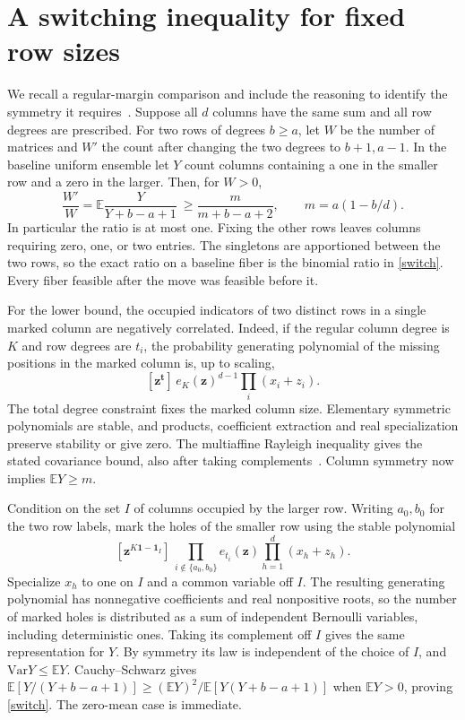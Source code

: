 \documentclass[11pt]{article}
\newcommand{\E}{\mathbb E}
\newcommand{\Var}{\mathrm{Var}}
\begin{document}
\section{A switching inequality for fixed row sizes}
We recall a regular-margin comparison and include the reasoning to identify the symmetry it requires~\cite{regular}. Suppose all $d$ columns have the same sum and all row degrees are prescribed. For two rows of degrees $b\ge a$, let $W$ be the number of matrices and $W'$ the count after changing the two degrees to $b+1,a-1$. In the baseline uniform ensemble let $Y$ count columns containing a one in the smaller row and a zero in the larger. Then, for $W>0$,
\begin{equation}\label{switch}
 \frac{W'}W=\E\frac{Y}{Y+b-a+1}\ \ge \frac{m}{m+b-a+2},\qquad m=a(1-b/d).
\end{equation}
In particular the ratio is at most one. Fixing the other rows leaves columns requiring zero, one, or two entries. The singletons are apportioned between the two rows, so the exact ratio on a baseline fiber is the binomial ratio in \eqref{switch}. Every fiber feasible after the move was feasible before it.

For the lower bound, the occupied indicators of two distinct rows in a single marked column are negatively correlated. Indeed, if the regular column degree is $K$ and row degrees are $t_i$, the probability generating polynomial of the missing positions in the marked column is, up to scaling,
\[
 [\mathbf z^{\mathbf t}]\,e_K(\mathbf z)^{d-1}\prod_i(x_i+z_i).
\]
The total degree constraint fixes the marked column size. Elementary symmetric polynomials are stable, and products, coefficient extraction and real specialization preserve stability or give zero. The multiaffine Rayleigh inequality gives the stated covariance bound, also after taking complements~\cite{bbl}. Column symmetry now implies $\E Y\ge m$.

Condition on the set $I$ of columns occupied by the larger row. Writing $a_0,b_0$ for the two row labels, mark the holes of the smaller row using the stable polynomial
\[
 [\mathbf z^{K\mathbf 1-\mathbf 1_I}]\,
 \prod_{i\notin\{a_0,b_0\}} e_{t_i}(\mathbf z)
 \prod_{h=1}^d(x_h+z_h).
\]
Specialize $x_h$ to one on $I$ and a common variable off $I$. The resulting generating polynomial has nonnegative coefficients and real nonpositive roots, so the number of marked holes is distributed as a sum of independent Bernoulli variables, including deterministic ones. Taking its complement off $I$ gives the same representation for $Y$. By symmetry its law is independent of the choice of $I$, and $\Var Y\le\E Y$. Cauchy--Schwarz gives $\E[Y/(Y+b-a+1)]\ge(\E Y)^2/\E[Y(Y+b-a+1)]$ when $\E Y>0$, proving \eqref{switch}. The zero-mean case is immediate.
\end{document}

